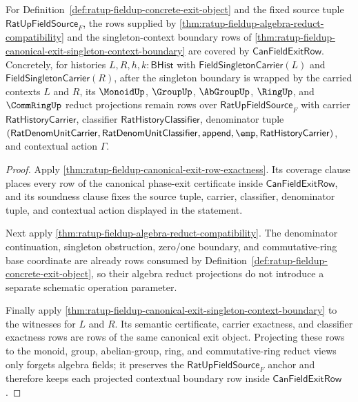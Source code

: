 \begin{theorem}
\label{thm:ratup-fieldup-reduct-context-exit-closure}
For Definition~\ref{def:ratup-fieldup-concrete-exit-object} and the fixed source
tuple $\mathsf{RatUpFieldSource}_F$, the rows supplied by
\autoref{thm:ratup-fieldup-algebra-reduct-compatibility} and the
singleton-context boundary rows of
\autoref{thm:ratup-fieldup-canonical-exit-singleton-context-boundary} are covered
by $\mathsf{CanFieldExitRow}$. Concretely, for histories
$L,R,h,k:\mathsf{BHist}$ with $\mathsf{FieldSingletonCarrier}(L)$ and
$\mathsf{FieldSingletonCarrier}(R)$, after the singleton boundary is wrapped by
the carried contexts $L$ and $R$, its $\MonoidUp$, $\GroupUp$, $\AbGroupUp$,
$\RingUp$, and $\CommRingUp$ reduct projections remain rows over
$\mathsf{RatUpFieldSource}_F$ with carrier $\mathsf{RatHistoryCarrier}$,
classifier $\mathsf{RatHistoryClassifier}$, denominator tuple
$(\mathsf{RatDenomUnitCarrier},\mathsf{RatDenomUnitClassifier},
\mathsf{append},\emp,\mathsf{RatHistoryCarrier})$, and contextual action
$\Gamma$.
\end{theorem}
\begin{proof}
Apply \autoref{thm:ratup-fieldup-canonical-exit-row-exactness}. Its coverage
clause places every row of the canonical phase-exit certificate inside
$\mathsf{CanFieldExitRow}$, and its soundness clause fixes the source tuple,
carrier, classifier, denominator tuple, and contextual action displayed in the
statement.

Next apply \autoref{thm:ratup-fieldup-algebra-reduct-compatibility}. The
denominator continuation, singleton obstruction, zero/one boundary, and
commutative-ring base coordinate are already rows consumed by
Definition~\ref{def:ratup-fieldup-concrete-exit-object}, so their algebra reduct
projections do not introduce a separate schematic operation parameter.

Finally apply
\autoref{thm:ratup-fieldup-canonical-exit-singleton-context-boundary} to the
witnesses for $L$ and $R$. Its semantic certificate, carrier exactness, and
classifier exactness rows are rows of the same canonical exit object. Projecting
these rows to the monoid, group, abelian-group, ring, and commutative-ring
reduct views only forgets algebra fields; it preserves the
$\mathsf{RatUpFieldSource}_F$ anchor and therefore keeps each projected
contextual boundary row inside $\mathsf{CanFieldExitRow}$.
\end{proof}

